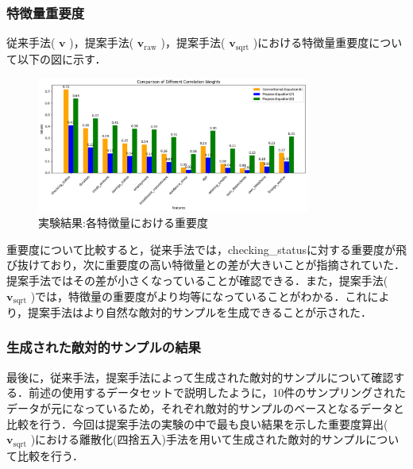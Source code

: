 \subsubsection{特徴量重要度}
従来手法( $\bm{v}$ )，提案手法( $\bm{v}_{\mathrm{raw}}$ )，提案手法( $\bm{v}_{\mathrm{sqrt}}$ )における特徴量重要度について以下の図に示す．
\begin{figure}[H]
    \centering
    \includegraphics[width=0.8\textwidth]{images/実験_重要度算出の結果.png}
    \caption{実験結果:各特徴量における重要度}
    \label{fig:adversarial_example}
\end{figure}
重要度について比較すると，従来手法では，checking\_statusに対する重要度が飛び抜けており，次に重要度の高い特徴量との差が大きいことが指摘されていた．提案手法ではその差が小さくなっていることが確認できる．また，提案手法( $\bm{v}_{\mathrm{sqrt}}$ )では，特徴量の重要度がより均等になっていることがわかる．これにより，提案手法はより自然な敵対的サンプルを生成できることが示された．

\subsubsection{生成された敵対的サンプルの結果}
最後に，従来手法，提案手法によって生成された敵対的サンプルについて確認する．前述の使用するデータセットで説明したように，10件のサンプリングされたデータが元になっているため，それぞれ敵対的サンプルのベースとなるデータと比較を行う．今回は提案手法の実験の中で最も良い結果を示した重要度算出( $\bm{v}_{\mathrm{sqrt}}$ )における離散化(四捨五入)手法を用いて生成された敵対的サンプルについて比較を行う．

